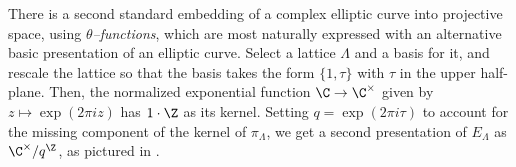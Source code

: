 There is a second standard embedding of a complex elliptic curve into projective space, using \textit{\(\theta\)--functions}, which are most naturally expressed with an alternative basic presentation of an elliptic curve.  Select a lattice \(\Lambda\) and a basis for it, and rescale the lattice so that the basis takes the form \(\{1, \tau\}\) with \(\tau\) in the upper half-plane.  Then, the normalized exponential function \(\C \to \C^{\times}\) given by \(z \mapsto \exp(2 \pi i z)\) has \(1 \cdot \Z\) as its kernel.  Setting \(q = \exp(2 \pi i \tau)\) to account for the missing component of the kernel of \(\pi_\Lambda\), we get a second presentation of \(E_\Lambda\) as \(\C^\times / q^{\Z}\), as pictured in .
\begin{figure}
\begin{center}
\end{center}
\end{figure}
